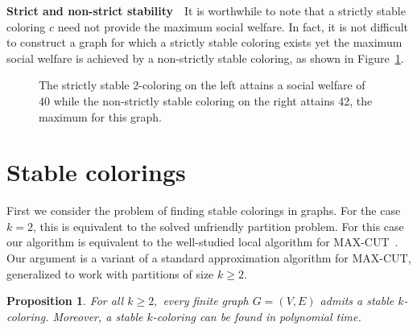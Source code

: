 \documentclass{llncs}
\newtheorem{propn}{Proposition}
\begin{document}
\noindent \textbf{Strict and non-strict stability}\ \
It is worthwhile to note that a strictly stable coloring $c$ need not provide
the maximum social welfare.  In fact, it is not difficult to construct a graph
for which a strictly stable coloring exists yet the maximum social welfare is
achieved by a non-strictly stable coloring, as shown in
Figure~\ref{fig:weakstrongwelfare}. 
\begin{figure}[t]
\centering
{}
\caption{The strictly stable 2-coloring on the left attains a social welfare of
40 while the non-strictly stable coloring on the right attains
42, the maximum for this graph.}
\label{fig:weakstrongwelfare}
\end{figure}

\section{Stable colorings}

First we consider the problem of finding stable colorings in graphs.  For the
case $k=2$, this is equivalent to the solved unfriendly partition problem.  For
this case our algorithm is  
equivalent to the well-studied local 
algorithm for MAX-CUT~\cite{ElsasserT11,MonienT10}.
Our argument is a variant of a standard approximation algorithm for
MAX-CUT, generalized to work with partitions of size $k \ge 2$.

\begin{propn}\label{propn:alg}
For all $k \ge 2,$ every finite graph $G=(V,E)$ admits a stable $k$-coloring.
Moreover, a stable $k$-coloring can be found in polynomial time.
\end{propn}
\end{document}
